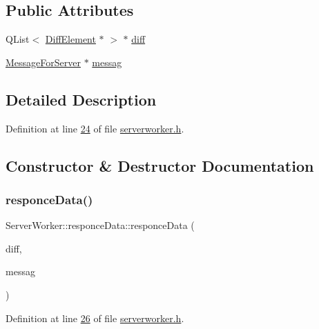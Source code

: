 \subsection*{Public Attributes}
\begin{DoxyCompactItemize}
\item 
Q\+List$<$ \hyperlink{a00141}{Diff\+Element} $\ast$ $>$ $\ast$ \hyperlink{a00189_abcaa9482893ea18f129f3b821e4b4ec8}{diff}
\item 
\hyperlink{a00121}{Message\+For\+Server} $\ast$ \hyperlink{a00189_a0915cfbfe5884aecde59303745ced47b}{messag}
\end{DoxyCompactItemize}


\subsection{Detailed Description}


Definition at line \hyperlink{a00110_source_l00024}{24} of file \hyperlink{a00110_source}{serverworker.\+h}.



\subsection{Constructor \& Destructor Documentation}
\mbox{\label{a00189_a7a5eda32e5aa3266882ecc57d89ff798}} 
\subsubsection{\texorpdfstring{responce\+Data()}{responceData()}}
{\footnotesize\ttfamily Server\+Worker\+::responce\+Data\+::responce\+Data (\begin{DoxyParamCaption}\item[{Q\+List$<$ \hyperlink{a00141}{Diff\+Element} $\ast$$>$ $\ast$}]{diff,  }\item[{\hyperlink{a00121}{Message\+For\+Server} $\ast$}]{messag }\end{DoxyParamCaption})\hspace{0.3cm}{\ttfamily [inline]}}



Definition at line \hyperlink{a00110_source_l00026}{26} of file \hyperlink{a00110_source}{serverworker.\+h}.



